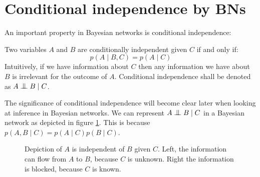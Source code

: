 \section{Conditional independence by BNs}
An important property in Bayesian networks is conditional independence:
\begin{defn}
Two variables $A$ and $B$ are conditionally independent given $C$ 
if and only if:
\begin{equation}
p(A \mid B, C) = p(A \mid C)
\end{equation}
Intuitively, if we have information about $C$ then any information
we have about $B$ is irrelevant for the outcome of $A$. Conditional
independence shall be denoted as $A \CI B \mid C$.
\end{defn}

\noindent
The significance of conditional independence will become clear later
when looking at inference in Bayesian networks. We can represent 
$A \CI B \mid C$ in a Bayesian network as depicted in figure
\ref{fig:BN_CI_ABC}. This is because 
$p(A, B \mid C) = p(A \mid C)p(B \mid C)$.

\begin{figure}[h!]
\centering
\begin{minipage}{0.3\textwidth}
\end{minipage}
\begin{minipage}{0.3\textwidth}
\end{minipage}

\caption{Depiction of $A$ is independent of $B$ given $C$. 
Left, the information can flow from $A$ to $B$, because $C$
is unknown. Right the 
information is blocked, because $C$
is known.}
\label{fig:BN_CI_ABC}
\end{figure}

